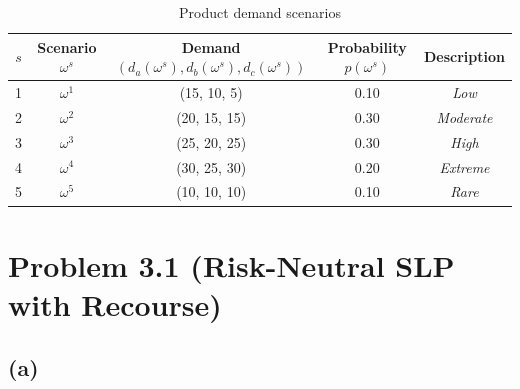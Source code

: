 \documentclass[7pt]{article}
\begin{document}
\begin{table}[h!]
    \footnotesize
    \captionsetup{skip=3pt}
    \centering
    \caption{Product demand scenarios}
    \begin{tabular}{|c|c|c|c|c|}
        \hline
        $s$ & Scenario $\omega^s$ & Demand $(d_a(\omega^s), d_b(\omega^s), d_c(\omega^s))$ & Probability $p(\omega^s)$ & Description       \\
        \hline
        1   & $\omega^1$          & (15, 10, 5)                                            & 0.10                      & \textit{Low}      \\
        2   & $\omega^2$          & (20, 15, 15)                                           & 0.30                      & \textit{Moderate} \\
        3   & $\omega^3$          & (25, 20, 25)                                           & 0.30                      & \textit{High}     \\
        4   & $\omega^4$          & (30, 25, 30)                                           & 0.20                      & \textit{Extreme}  \\
        5   & $\omega^5$          & (10, 10, 10)                                           & 0.10                      & \textit{Rare}     \\
        \hline
    \end{tabular}
\end{table}

\section{Problem 3.1 (Risk-Neutral SLP with Recourse)}
\subsection*{(a)}
\end{document}
